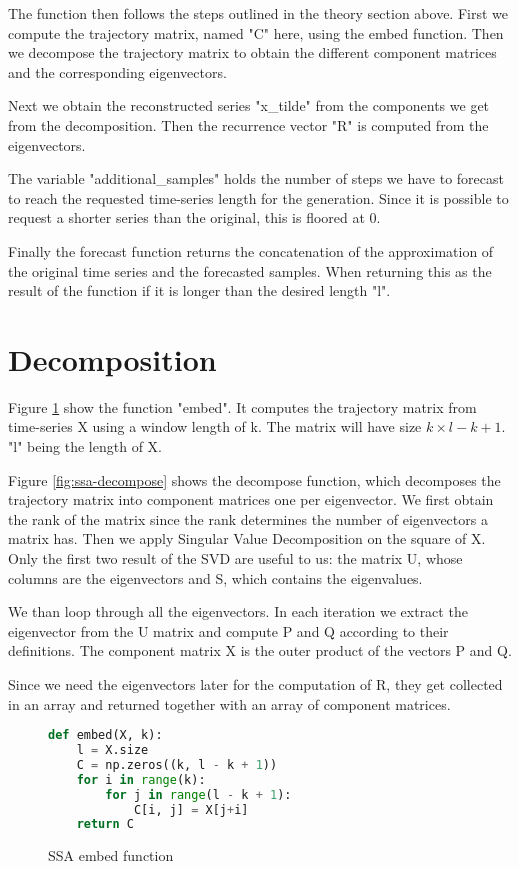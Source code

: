 The function then follows the steps outlined in the theory section above. First we compute the trajectory matrix, named "C" here, using the embed function. Then we decompose the trajectory matrix to obtain the different component matrices and the corresponding eigenvectors. 

Next we obtain the reconstructed series "x\_tilde" from the components we get from the decomposition. Then the recurrence vector "R" is computed from the eigenvectors. 

The variable "additional\_samples" holds the number of steps we have to forecast to reach the requested time-series length for the generation. Since it is possible to request a shorter series than the original, this is floored at 0. 

Finally the forecast function returns the concatenation of the approximation of the original time series and the forecasted samples. When returning this as the result of the function if it is longer than the desired length "l". 

\section{Decomposition}

Figure \ref{fig:ssa-embed} show the function "embed". It computes the trajectory matrix from time-series X using a window length of k. The matrix will have size $k \times l-k+1$. "l" being the length of X. 

Figure \ref{fig:ssa-decompose} shows the decompose function, which decomposes the trajectory matrix into component matrices one per eigenvector.  We first obtain the rank of the matrix since the rank determines the number of eigenvectors a matrix has. Then we apply Singular Value Decomposition on the square of X. Only the first two result of the SVD are useful to us: the matrix U, whose columns are the eigenvectors and S, which contains the eigenvalues. 

We than loop through all the eigenvectors. In each iteration we extract the eigenvector from the U matrix and compute P and Q according to their definitions. The component matrix X is the outer product of the vectors P and Q. 

Since we need the eigenvectors later for the computation of R, they get collected in an array and returned together with an array of component matrices. 

\begin{figure}
\begin{singlespace}
\begin{lstlisting}[language=Python]
def embed(X, k):
    l = X.size
    C = np.zeros((k, l - k + 1))
    for i in range(k):
        for j in range(l - k + 1):
            C[i, j] = X[j+i]
    return C
\end{lstlisting}
\end{singlespace}
\caption{SSA embed function}    
\label{fig:ssa-embed}
\end{figure}

